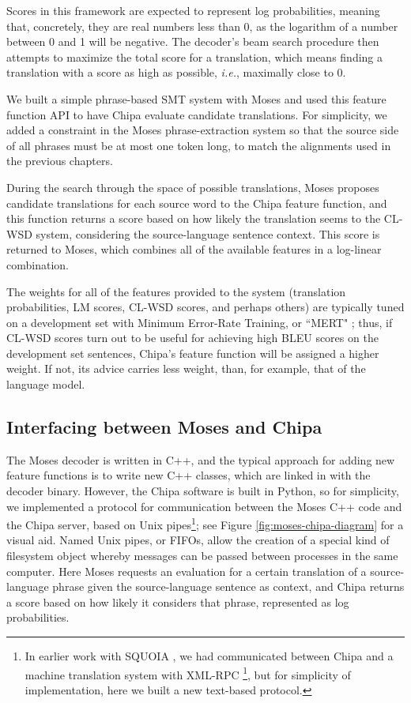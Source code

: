 Scores in this framework are expected to represent log probabilities, meaning
that, concretely, they are real numbers less than 0, as the logarithm of a
number between 0 and 1 will be negative. The decoder's beam search procedure
then attempts to maximize the total score for a translation, which means
finding a translation with a score as high as possible, \emph{i.e.}, maximally
close to 0.

We built a simple phrase-based SMT system with Moses and used this feature
function API to have Chipa evaluate candidate translations. For simplicity, we
added a constraint in the Moses phrase-extraction system so that the source
side of all phrases must be at most one token long, to match the alignments
used in the previous chapters.

During the search through the space of possible translations, Moses proposes
candidate translations for each source word to the Chipa feature function, and
this function returns a score based on how likely the translation seems to the
CL-WSD system, considering the source-language sentence context. This score is
returned to Moses, which combines all of the available features in a log-linear
combination.

The weights for all of the features provided to the system (translation
probabilities, LM scores, CL-WSD scores, and perhaps others) are typically tuned
on a development set with Minimum Error-Rate Training, or ``MERT"
\cite{och:2003:ACL} ; thus, if CL-WSD scores turn out to be useful for achieving
high BLEU scores on the development set sentences, Chipa's feature function will
be assigned a higher weight. If not, its advice carries less weight, than, for
example, that of the language model.

\subsection{Interfacing between Moses and Chipa}
The Moses decoder is written in C++, and the typical approach for adding new
feature functions is to write new C++ classes, which are linked in with the
decoder binary. However, the Chipa software is built in Python, so for
simplicity, we implemented a protocol for communication between the Moses C++
code and the Chipa server, based on Unix pipes\footnote{In earlier work with
SQUOIA \cite{rudnick:saltmil2014}, we had communicated between Chipa and a
machine translation system with XML-RPC
\footnote{\url{http://xmlrpc.scripting.com/}}, but for simplicity of
implementation, here we built a new text-based protocol.}; see Figure
\ref{fig:moses-chipa-diagram} for a visual aid.  Named Unix pipes, or FIFOs,
allow the creation of a special kind of filesystem object whereby messages can
be passed between processes in the same computer. Here Moses requests an
evaluation for a certain translation of a source-language phrase given the
source-language sentence as context, and Chipa returns a score based on how
likely it considers that phrase, represented as log probabilities.

